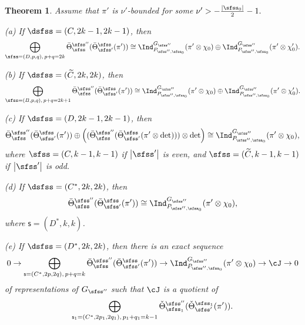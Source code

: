 \documentclass[12pt,a4paper]{amsart}
\def\abs#1{\left|{#1}\right|}
\numberwithin{equation}{section}
\newtheorem{thm}{Theorem}[section]
\theoremstyle{remark}
\def\Thetab{\bar{\Theta}}
\begin{document}
\begin{thm}Assume that $\pi'$  is $\nu'$-bounded for some 
$
  \nu'>
 -\frac{\abs{\sfss_0}}{2}-1.
$

\noindent 
(a) If $\dsfss=(C,2k-1, 2k-1)$,  then
\[
    \bigoplus_{\sfss=(D,p,q), \, p+q=2k}   \Thetab^{\sfss''}_{\sfss}(\Thetab^{\sfss}_{\sfss'}(\pi'))\cong \Ind_{P_{\sfss'',\sfss_0}}^{G_{\sfss''}} (\pi'\otimes \chi_0)
    \oplus  \Ind_{P_{\sfss'',\sfss_0}}^{G_{\sfss''}} (\pi' \otimes \chi'_0).
    \]
    
  \smallskip  
    
 \noindent (b) If $\dsfss=(\widetilde C,2k,2k)$,  then
\[
    \bigoplus_{\sfss=(B,p,q), \, p+q=2k+1}  \Thetab^{\sfss''}_{\sfss}(\Thetab^{\sfss}_{\sfss'}(\pi'))\cong \Ind_{P_{\sfss'',\sfss_0}}^{G_{\sfss''}} (\pi'\otimes \chi_0)
    \oplus  \Ind_{P_{\sfss'',\sfss_0}}^{G_{\sfss''}} (\pi' \otimes \chi'_0).
    \]
    
  \smallskip  
    
    \noindent 
(c) If $\dsfss=(D,2k-1,2k-1)$, then
\[
 \Thetab^{\sfss''}_{\sfss}(\Thetab^{\sfss}_{\sfss'}(\pi'))\oplus\left(  (\Thetab^{\sfss''}_{\sfss}(\Thetab^{\sfss}_{\sfss'}(\pi'\otimes \det)))\otimes \det \right)\cong \Ind_{P_{\sfss'',\sfss_0}}^{G_{\sfss''}} (\pi'\otimes \chi_0),
\]
where $\sfss=(C,k-1,k-1)$ if $\abs{\sfss'}$ is even, and  $\sfss=(\widetilde C,k-1,k-1)$ if $\abs{\sfss'}$ is odd. 

  \smallskip  
  
\noindent 
(d) If $\dsfss=(C^*,2k,2k)$, then
\[
 \Thetab^{\sfss''}_{\sfss}(\Thetab^{\sfss}_{\sfss'}(\pi'))\cong \Ind_{P_{\sfss'',\sfss_0}}^{G_{\sfss''}} (\pi'\otimes \chi_0),
 \]
where $ \mathsf s=(D^*, k, k)$.


\smallskip  
  
\noindent 
(e) If $\dsfss=(D^*,2k,2k)$, then there is an exact sequence  
\[
 0\rightarrow   \bigoplus_{\mathsf s=(C^*, 2p, 2q), \, p+q=k}  \Thetab^{\sfss''}_{\sfss}(\Thetab^{\sfss}_{\sfss'}(\pi'))\rightarrow \Ind_{P_{\sfss'',\sfss_0}}^{G_{\sfss''}} (\pi'\otimes \chi_0)\rightarrow \cJ\rightarrow 0
\]
 of representations of $G_{\sfss''}$ such that $\cJ$ is a quotient of   
\[
\bigoplus_{\mathsf s_1=(C^*, 2p_1, 2q_1), \, p_1+q_1=k-1} \check \Theta^{\sfss''}_{\sfss_1}(\check \Theta^{\sfss_1}_{\sfss'}(\pi')).
\]
\end{thm}
\end{document}
